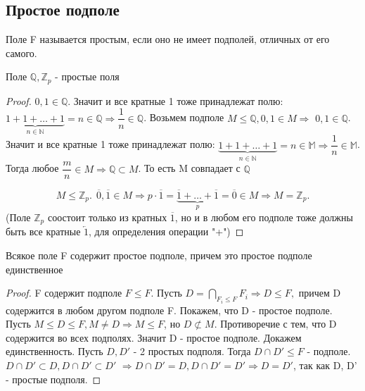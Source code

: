\subsection{Простое подполе}
\begin{definition}
	Поле F называется простым, если оно не имеет подполей, отличных от его самого.
\end{definition}
\begin{example}
	Поле \(\mathbb{Q}, \mathbb{Z}_p\) - простые поля
\end{example}
\begin{proof}
	$0, 1 \in \mathbb{Q}$. Значит и все кратные 1 тоже принадлежат полю: \(\underbrace{1+1+\ldots+1}_{n\in\mathbb{N}} = n\in \mathbb{Q}\Longrightarrow \dfrac{1}{n}\in\mathbb{Q}\). 
	Возьмем подполе \(M\le \mathbb{Q}, 0, 1\in M \Longrightarrow\) $0, 1 \in \mathbb{Q}$. 
	Значит и все кратные 1 тоже принадлежат полю: \(\underbrace{1+1+\ldots+1}_{n\in\mathbb{N}} = n\in \mathbb{M}\Longrightarrow \dfrac{1}{n}\in\mathbb{M}\). 
	Тогда любое \(\dfrac{m}{n}\in M \Longrightarrow \mathbb{Q}\subset M\). 
	То есть M совпадает с \(\mathbb{Q}\)\newline

	\[M\le \mathbb{Z}_p.\> \> \overline 0, \overline 1\in M\Longrightarrow p\cdot\overline 1 = \underbrace{\overline 1+\ldots + \overline 1}_{p} = \overline 0\in M \Longrightarrow M = \mathbb{Z}_p.\] 
	(Поле $\mathbb{Z}_p$ соостоит только из кратных $\overline{1}$, но и в любом его подполе тоже должны быть все кратные $\overleftarrow{1}$, для определения операции "+")
\end{proof}
\begin{theorem}
	Всякое поле F содержит простое подполе, причем это простое подполе единственное
\end{theorem}
\begin{proof}
	F содержит подполе \(F\le F\). Пусть \(D = \bigcap_{F_i\le F} F_i\Longrightarrow D\le F,\) причем D содержится в любом другом подполе F.
	Покажем, что D - простое подполе. Пусть \(M\le D\le F, M\ne D\Longrightarrow M\le F\), но \(D\not\subset M\).
	Противоречие с тем, что D содержится во всех подполях. Значит D - простое подполе. \newline
	Докажем единственность. Пусть \(D, D'\) - 2 простых подполя. Тогда \(D\cap D'\le F\) - подполе. 
	$D\cap D'\subset D, D\cap D'\subset D'$ $\Longrightarrow D\cap D' = D, D\cap D' = D'\Longrightarrow D = D'$, так как D, D' - простые подполя.
\end{proof}















